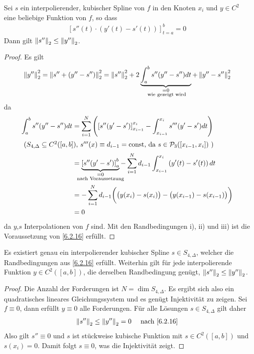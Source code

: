 \begin{Satze}\label{6.2.16}
  Sei $s$ ein interpolierender, kubischer Spline von $f$
  in den Knoten $x_i $ und $y\in C^2$ eine beliebige Funktion
  von $f$, so dass 
  \begin{gather*}
    \left[s''(t)\cdot(y'(t)-s'(t))\right]_{t=a}^{b}=0
  \end{gather*}
  Dann gilt $\nn[s'']_2 \leq \nn[y'']_2$.

  \begin{proof}
    Es gilt
    \begin{gather*}
      \nn[y'']_2^2 = \nn[s''+(y''-s'')]_2^2
      = \nn[s'']_2^2
      + 2\underbrace{\int_{a}^{b}s''(y''-s'')dt}_{
        \mathclap{\substack{=0 \\ \text{ wie gezeigt wird}}}
      }
      + \nn[y''-s'']_2^2
    \end{gather*}
    da
    \begin{align*}
      \int_{a}^{b} s''(y''-s'')dt 
      &= \sum_{i=1}^{N}\left(\left[
        s''(y'-s')\right]_{x_{i-1}}^{x_i}
        -\int_{x_{i-1}}^{x_i}s'''(y'-s')dt\right)\\
      \intertext{
      ($S_{4,\Delta}\subseteq C^2([a,b])$, 
      $s'''(x)\equiv d_{i-1}=\Const$, 
      da $s\in\p_3([x_{i-1},x_i])$ )
      }
      &= \underbrace{\left[ s''(y'-s')\right]_{a}^{b}}_{
        \mathclap{\substack{ =0 \\ \text{ nach Voraussetzung } }}
      }
      - \sum_{i=1}^{N} d_{i-1}
      \int_{x_{i-1}}^{x_i} \left(y'(t)-s'(t)\right) dt\\
      &=-\sum_{i=1}^N d_{i-1}\bigg(\big(y(x_i)-s(x_i)\big)
        - \big(y(x_{i-1})-s(x_{i-1})\big)\bigg) \\
      &=0
    \end{align*}
    da $y$,$s$ Interpolationen von $f$ sind.
    Mit den Randbedingungen i), ii) und iii) 
    ist die Voraussetzung von \ref{6.2.16} erfüllt.
  \end{proof}
\end{Satze}

\begin{Kore}\label{6.2.17}
  Es existiert genau ein interpolierender kubischer Spline 
  $s\in S_{4,\Delta}$, welcher die Randbedingungen aus \ref{6.2.16}
  erfüllt.
  Weiterhin gilt für jede interpolierende Funktion $y\in C^2([a,b])$,
  die derselben Randbedingung genügt,
  $\nn[s'']_2 \leq \nn[y'']_2$.
  \begin{proof}
    Die Anzahl der Forderungen ist $N=\dim S_{4,\Delta}$.
    Es ergibt sich also ein quadratisches lineares Gleichungssystem
    und es genügt Injektivität zu zeigen.
    Sei $f\equiv 0$, dann erfüllt $y\equiv 0$ alle Forderungen.
    Für alle Lösungen $s\in S_{4,\Delta}$ gilt daher
    \begin{gather*}
      \nn[s'']_2\leq \nn[y'']_2 =0 \quad \text{ nach \ref{6.2.16}}
    \end{gather*}
    Also gilt $s''\equiv 0$ und $s$ ist stückweise kubische Funktion
    mit $s\in C^2([a,b])$  und $s(x_i)=0$.
    Damit folgt $s\equiv 0$, was die Injektivität zeigt.
  \end{proof}
\end{Kore}


